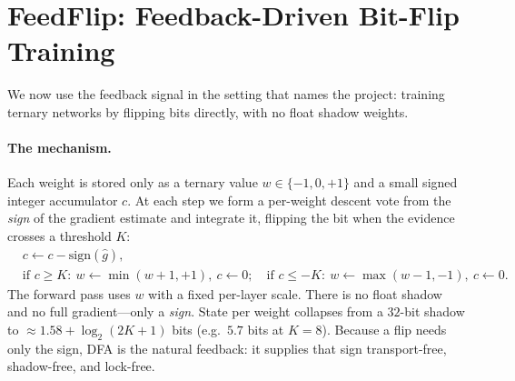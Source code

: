 \documentclass[11pt]{article}
\begin{document}
\section{FeedFlip: Feedback-Driven Bit-Flip Training}\label{sec:feedflip}
We now use the feedback signal in the setting that names the project: training ternary networks by flipping bits directly, with no float shadow weights.

\paragraph{The mechanism.} Each weight is stored only as a ternary value $w\in\{-1,0,+1\}$ and a small signed integer accumulator $c$. At each step we form a per-weight descent vote from the \emph{sign} of the gradient estimate and integrate it, flipping the bit when the evidence crosses a threshold $K$:
\begin{equation}
\begin{aligned}
&c \leftarrow c - \mathrm{sign}(\hat g),\\
&\text{if } c \ge K:\ w \leftarrow \min(w{+}1,+1),\ c\leftarrow 0;\quad
\text{if } c \le -K:\ w \leftarrow \max(w{-}1,-1),\ c\leftarrow 0.
\end{aligned}
\end{equation}
The forward pass uses $w$ with a fixed per-layer scale. There is no float shadow and no full gradient---only a \emph{sign}. State per weight collapses from a $32$-bit shadow to $\approx\!1.58 + \log_2(2K{+}1)$ bits (e.g.\ $5.7$ bits at $K{=}8$). Because a flip needs only the sign, DFA is the natural feedback: it supplies that sign transport-free, shadow-free, and lock-free.
\end{document}
